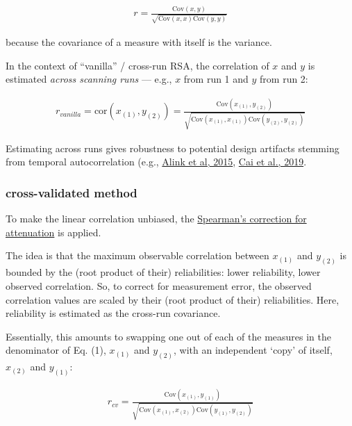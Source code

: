 \documentclass{article}\usepackage[]{graphicx}\usepackage[]{color}
\begin{document}
\begin{align*}
  r = \frac{\text{Cov}(x, y)}{\sqrt{\text{Cov}(x, x)\text{Cov}(y, y)}}
\end{align*}

because the covariance of a measure with itself is the variance.

In the context of ``vanilla'' / cross-run RSA, the correlation of $x$ and $y$  is estimated \textit{across scanning runs} --- e.g., $x$ from run 1 and $y$ from run 2:

\begin{align}
  r_\textit{vanilla} = \text{cor}(x_{(1)}, y_{(2)}) = 
  \frac{\text{Cov}(x_{(1)}, y_{(2)})}
  {\sqrt{\text{Cov}(x_{(1)}, x_{(1)})\text{Cov}(y_{(2)}, y_{(2)})}}
\end{align}

Estimating across runs gives robustness to potential design artifacts stemming from temporal autocorrelation (e.g., \href{https://www.biorxiv.org/content/10.1101/032391v2}{Alink et al, 2015}, \href{}{Cai et al., 2019}.


\subsubsection*{cross-validated method}

To make the linear correlation unbiased, the \href{https://en.wikipedia.org/wiki/Correction_for_attenuation}{Spearman's correction for attenuation} is applied.

The idea is that the maximum observable correlation between $x_{(1)}$ and $y_{(2)}$ is bounded by the (root product of their) reliabilities: lower reliability, lower observed correlation.
So, to correct for measurement error, the observed correlation values are scaled by their (root product of their) reliabilities.
Here, reliability is estimated as the cross-run covariance.

Essentially, this amounts to swapping one out of each of the measures in the denominator of Eq. (1), $x_{(1)}$ and  $y_{(2)}$, with an independent `copy' of itself, $x_{(2)}$ and $y_{(1)}$:

\begin{align}
  r_\textit{cv} = \frac
  {\text{Cov}(x_{(1)}, y_{(1)})}
  {\sqrt{\text{Cov}(x_{(1)}, x_{(2)})\text{Cov}(y_{(1)}, y_{(2)})}}
\end{align}
\end{document}
